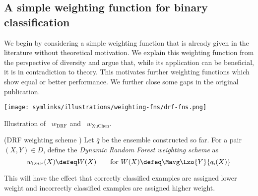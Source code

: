 \documentclass[../main.tex]{subfiles}
\begin{document}




\subsection{A simple weighting function for binary classification}
\label{sec:simple-weighting-function}

We begin by considering a simple weighting function that is already given in the literature without theoretical motivation. We explain this weighting function from the perspective of diversity and argue that, while its application can be beneficial, it is in contradiction to theory. This motivates further weighting functions which show equal or better performance. We further close some gaps in the original publication. 

\begin{marginfigure}
    \texttt{[image: symlinks/illustrations/weighting-fns/drf-fns.png]}
    \caption{Illustration of \tikzcircle[fill=blue]{3pt}~$w_{\text{DRF}}$ and \tikzcircle[fill=orange]{3pt}~$w_{\text{XuChen}}$.}
\end{marginfigure}
\begin{definition} (DRF weighting scheme \cite{bernard_DynamicRandomForests_2012})
Let $\bar{q}$ be the ensemble constructed so far. For a pair $(X,Y) \in D$, define the \textit{Dynamic Random Forest weighting scheme} as 
$$
w_{\text{DRF}}(X) \defeq W(X)
\hspace{2em} \text{for~}  W(X) \defeq \Mavg \Lzo{Y}{q_i(X)}
$$
\label{def:drf-weighting-scheme}
\end{definition}
This will have the effect that correctly classified examples are assigned lower weight and incorrectly classified examples are assigned higher weight.  %
\end{document}
